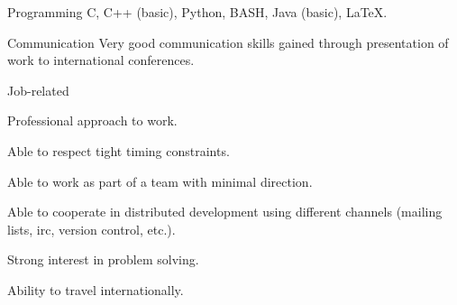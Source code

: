 \begin{cvskills}

  \cvskill
    {Programming} %
    {C, C++ (basic), Python, BASH, Java (basic), LaTeX.} %

  \cvskill
    {Communication} %
    {Very good communication skills gained through presentation of work
	to international conferences.} %

  \cvskill
    {Job-related} %
    {
      \begin{cvitems} %
        \item {Professional approach to work.}
        \item {Able to respect tight timing constraints.}
        \item {Able to work as part of a team with minimal direction.}
        \item {Able to cooperate in distributed development using different channels
		(mailing lists, irc, version control, etc.).}
        \item {Strong interest in problem solving.}
        \item {Ability to travel internationally.}
      \end{cvitems}
    }

\end{cvskills}
